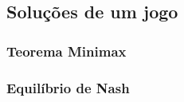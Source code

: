 \subsection{Soluções de um jogo}
\label{sec:solucoes-de-um-jogo}

\subsubsection{Teorema Minimax}
\label{subsubsec:teorema-minimax}

\subsubsection{Equilíbrio de Nash}
\label{subsubsec:equilibrio-de-nash}
